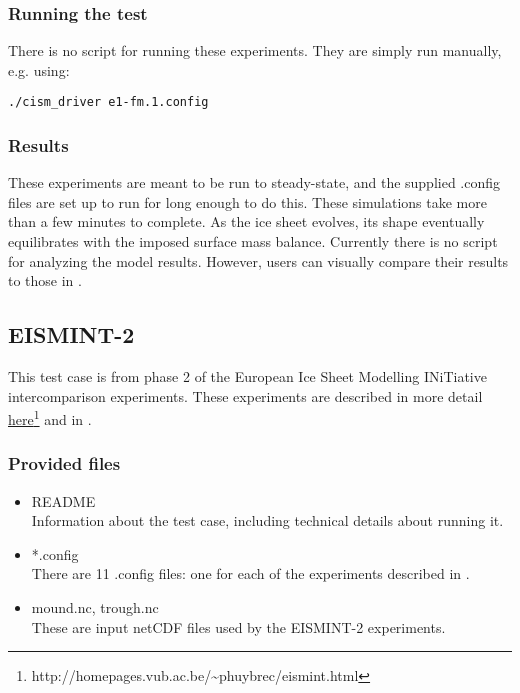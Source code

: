 \subsubsection{Running the test}
There is no script for running these experiments. They are simply run manually, e.g. using: 

\texttt{./cism\_driver e1-fm.1.config}

\subsubsection{Results}
\label{subsecc:eismint_results}
These experiments are meant to be run to steady-state, and the supplied .config files are set up to run for long enough to do this.
These simulations take more than a few minutes to complete.
As the ice sheet evolves, its shape eventually equilibrates with the imposed surface mass balance.  
Currently there is no script for analyzing the model results.  
However, users can visually compare their results to those in \citet{Huybrechts1996}.


\subsection{EISMINT-2}
\label{sec:eismint2_description}
This test case is from phase 2 of the European Ice Sheet Modelling INiTiative intercomparison experiments.  These experiments are described in more detail
\href{http://homepages.vub.ac.be/~phuybrec/eismint.html}{here}\footnote{http://homepages.vub.ac.be/\textasciitilde{}phuybrec/eismint.html} and in \citet{Payne2000}.

\subsubsection{Provided files}
\label{subsec:eismint2_files}

\begin{itemize}
	\item README \\
	Information about the test case, including technical details about running it.
  	\item *.config \\
  	There are 11 .config files: one for each of the experiments described in \citet{Payne2000}.
  	\item mound.nc, trough.nc \\
    	These are input netCDF files used by the EISMINT-2 experiments.
\end{itemize}

